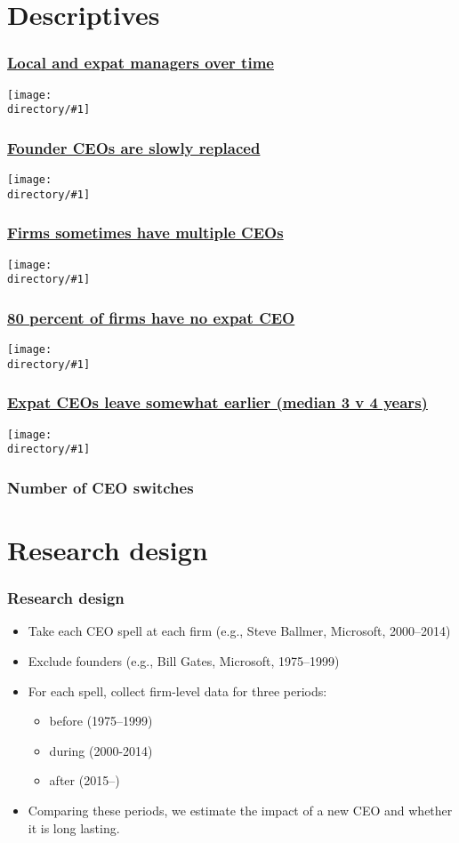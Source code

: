 \documentclass[aspectratio=43,compress,mathserif]{beamer}
\newcounter{perc}
\newcommand{\directory}{output/figure}
\newcommand{\widefigure}[2]{\begin{frame}\frametitle{\hyperlink{#1back}{#2}}\hypertarget{#1}{{\begin{center}\texttt{[image: \\directory/\#1]}\end{center}}}\end{frame}}
\begin{document}
\section{Descriptives}\hypertarget{Descriptives}{}
\widefigure{shares_over_time}{Local and expat managers over time}
\widefigure{CEO_type_by_age}{Founder CEOs are slowly replaced}
\widefigure{CEO_N_histogram}{Firms sometimes have multiple CEOs}
\widefigure{CEO_N_histogram_by}{80 percent of firms have no expat CEO}
\widefigure{CEO_tenure_histogram}{Expat CEOs leave somewhat earlier (median 3 v 4 years)}


\begin{frame}\frametitle{Number of CEO switches}\hypertarget{Number of CEO switches}{}





\end{frame}







\section{Research design}\hypertarget{Research design}{}
\begin{frame}\frametitle{Research design}\hypertarget{Research design}{}
\begin{itemize}
\item Take each CEO spell at each firm (e.g., Steve Ballmer, Microsoft, 2000--2014)

\item Exclude founders (e.g., Bill Gates, Microsoft, 1975--1999)

\item For each spell, collect firm-level data for three periods:
\begin{itemize}
\item before (1975--1999)

\item during (2000-2014)

\item after (2015--)
\end{itemize}

\item Comparing these periods, we estimate the impact of a new CEO and whether it is long lasting.


\end{itemize}
\end{frame}
\end{document}
